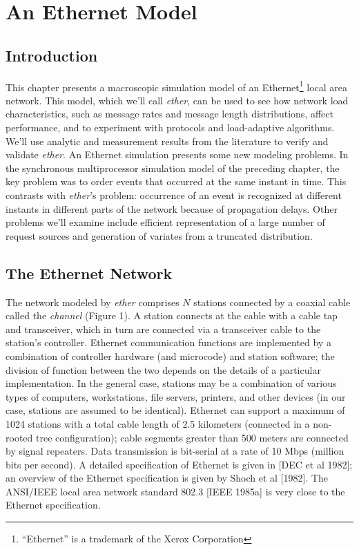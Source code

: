 \chapter{An Ethernet Model}
\label{chap:ethernet-model}

\section{Introduction}

This chapter presents a macroscopic simulation model of an Ethernet\footnote{``Ethernet'' is a trademark of the Xerox Corporation} local area network. This model, which we'll call \emph{ether}, can be used to see how network load characteristics, such as message rates and message length distributions, affect performance, and to experiment with protocols and load-adaptive algorithms. We'll use analytic and measurement results from the literature to verify and validate \emph{ether}. An Ethernet simulation presents some new modeling problems. In the synchronous multiprocessor simulation model of the preceding chapter, the key problem was to order events that occurred at the same instant in time. This contrasts with \emph{ether}'s problem: occurrence of an event is recognized at different instants in different parts of the network because of propagation delays. Other problems we'll examine include efficient representation of a large number of request sources and generation of variates from a truncated distribution.

\section{The Ethernet Network}

The network modeled by \emph{ether} comprises $N$ stations connected by a coaxial cable called the \emph{channel} (Figure 1). A station connects at the cable with a cable tap and transceiver, which in turn are connected via a transceiver cable to the station's controller. Ethernet communication functions are implemented by a combination of controller hardware (and microcode) and station software; the division of function between the two depends on the details of a particular implementation. In the general case, stations may be a combination of various types of computers, workstations, file servers, printers, and other devices (in our case, stations are assumed to be identical). Ethernet can support a maximum of 1024 stations with a total cable length of 2.5 kilometers (connected in a non-rooted tree configuration); cable segments greater than 500 meters are connected by signal repeaters. Data transmission is bit-serial at a rate of 10 Mbps (million bits per second). A detailed specification of Ethernet is given in [DEC et al 1982]; an overview of the Ethernet specification is given by Shoch et al [1982]. The ANSI/IEEE local area network standard 802.3 [IEEE 1985a] is very close to the Ethernet specification.

